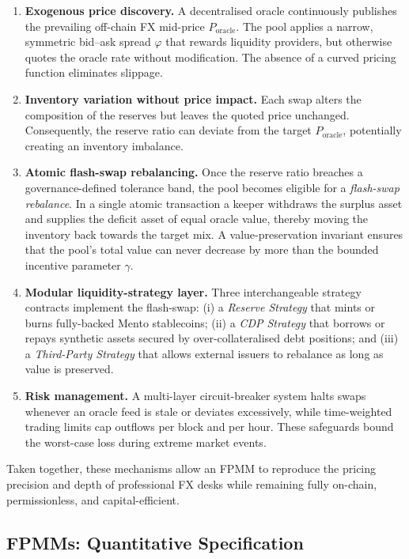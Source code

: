 \documentclass[a4paper]{article}
\theoremstyle{definition}
\begin{document}
\begin{enumerate}[leftmargin=*]
  \item \textbf{Exogenous price discovery.} A decentralised oracle continuously publishes the prevailing off-chain FX mid-price $P_{\mathrm{oracle}}$. The pool applies a narrow, symmetric bid–ask spread $\varphi$ that rewards liquidity providers, but otherwise quotes the oracle rate without modification. The absence of a curved pricing function eliminates slippage.
  \item \textbf{Inventory variation without price impact.} Each swap alters the composition of the reserves but leaves the quoted price unchanged. Consequently, the reserve ratio can deviate from the target $P_{\mathrm{oracle}}$, potentially creating an inventory imbalance.
  \item \textbf{Atomic flash-swap rebalancing.} Once the reserve ratio breaches a governance-defined tolerance band, the pool becomes eligible for a \emph{flash-swap rebalance}. In a single atomic transaction a keeper withdraws the surplus asset and supplies the deficit asset of equal oracle value, thereby moving the inventory back towards the target mix. A value-preservation invariant ensures that the pool's total value can never decrease by more than the bounded incentive parameter $\gamma$.
  \item \textbf{Modular liquidity-strategy layer.} Three interchangeable strategy contracts implement the flash-swap: (i) a \emph{Reserve Strategy} that mints or burns fully-backed Mento stablecoins; (ii) a \emph{CDP Strategy} that borrows or repays synthetic assets secured by over-collateralised debt positions; and (iii) a \emph{Third-Party Strategy} that allows external issuers to rebalance as long as value is preserved.
  \item \textbf{Risk management.} A multi-layer circuit-breaker system halts swaps whenever an oracle feed is stale or deviates excessively, while time-weighted trading limits cap outflows per block and per hour. These safeguards bound the worst-case loss during extreme market events.
\end{enumerate}

Taken together, these mechanisms allow an FPMM to reproduce the pricing precision and depth of professional FX desks while remaining fully on-chain, permissionless, and capital-efficient.

\subsection{FPMMs: Quantitative Specification}\label{sec:fpmm_math}
\end{document}
